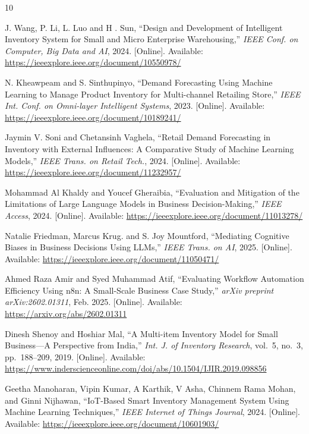 \documentclass[journal]{IEEEtran}
\begin{document}
\begin{thebibliography}{10}

J. Wang, P. Li, L. Luo and H . Sun, ``Design and Development of Intelligent Inventory System for Small and Micro Enterprise Warehousing,'' \emph{IEEE Conf. on Computer, Big Data and AI}, 2024. [Online]. Available: \url{https://ieeexplore.ieee.org/document/10550978/}

N. Kheawpeam and S. Sinthupinyo, ``Demand Forecasting Using Machine Learning to Manage Product Inventory for Multi-channel Retailing Store,'' \emph{IEEE Int. Conf. on Omni-layer Intelligent Systems}, 2023. [Online]. Available: \url{https://ieeexplore.ieee.org/document/10189241/}

Jaymin V. Soni and Chetansinh Vaghela, ``Retail Demand Forecasting in Inventory with External Influences: A Comparative Study of Machine Learning Models,'' \emph{IEEE Trans. on Retail Tech.}, 2024. [Online]. Available: \url{https://ieeexplore.ieee.org/document/11232957/}

Mohammad Al Khaldy and Youcef Gheraibia, ``Evaluation and Mitigation of the Limitations of Large Language Models in Business Decision-Making,'' \emph{IEEE Access}, 2024. [Online]. Available: \url{https://ieeexplore.ieee.org/document/11013278/}

Natalie Friedman, Marcus Krug. and S. Joy Mountford, ``Mediating Cognitive Biases in Business Decisions Using LLMs,'' \emph{IEEE Trans. on AI}, 2025. [Online]. Available: \url{https://ieeexplore.ieee.org/document/11050471/}

Ahmed Raza Amir and Syed Muhammad Atif, ``Evaluating Workflow Automation Efficiency Using n8n: A Small-Scale Business Case Study,'' \emph{arXiv preprint arXiv:2602.01311}, Feb. 2025. [Online]. Available: \url{https://arxiv.org/abs/2602.01311}

Dinesh Shenoy and Hoshiar Mal, ``A Multi-item Inventory Model for Small Business---A Perspective from India,'' \emph{Int. J. of Inventory Research}, vol.~5, no.~3, pp.~188--209, 2019. [Online]. Available: \url{https://www.inderscienceonline.com/doi/abs/10.1504/IJIR.2019.098856}

Geetha Manoharan, Vipin Kumar, A Karthik, V Asha, Chinnem Rama Mohan, and Ginni Nijhawan, ``IoT-Based Smart Inventory Management System Using Machine Learning Techniques,'' \emph{IEEE Internet of Things Journal}, 2024. [Online]. Available: \url{https://ieeexplore.ieee.org/document/10601903/}


\end{thebibliography}
\end{document}
